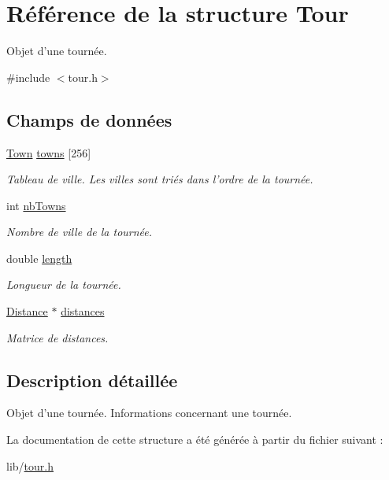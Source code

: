 \hypertarget{structTour}{
\section{Référence de la structure Tour}
\label{structTour}
}


Objet d'une tournée.  




{\ttfamily \#include $<$tour.h$>$}

\subsection*{Champs de données}
\begin{DoxyCompactItemize}
\item 
\hypertarget{structTour_a3bbc2397fe043fdc5d9d18695368f2ca}{
\hyperlink{structTown}{Town} \hyperlink{structTour_a3bbc2397fe043fdc5d9d18695368f2ca}{towns} \mbox{[}256\mbox{]}}
\label{structTour_a3bbc2397fe043fdc5d9d18695368f2ca}

\begin{DoxyCompactList}\small\item\em Tableau de ville. Les villes sont triés dans l'ordre de la tournée. \item\end{DoxyCompactList}\item 
\hypertarget{structTour_af54d0892d0de565850fdf26e98b90a03}{
int \hyperlink{structTour_af54d0892d0de565850fdf26e98b90a03}{nbTowns}}
\label{structTour_af54d0892d0de565850fdf26e98b90a03}

\begin{DoxyCompactList}\small\item\em Nombre de ville de la tournée. \item\end{DoxyCompactList}\item 
\hypertarget{structTour_ad7ec8574d813b76140f78b035cdd93a9}{
double \hyperlink{structTour_ad7ec8574d813b76140f78b035cdd93a9}{length}}
\label{structTour_ad7ec8574d813b76140f78b035cdd93a9}

\begin{DoxyCompactList}\small\item\em Longueur de la tournée. \item\end{DoxyCompactList}\item 
\hypertarget{structTour_a4da8a499459d000a23d79af9d1a5565d}{
\hyperlink{structDistance}{Distance} $\ast$ \hyperlink{structTour_a4da8a499459d000a23d79af9d1a5565d}{distances}}
\label{structTour_a4da8a499459d000a23d79af9d1a5565d}

\begin{DoxyCompactList}\small\item\em Matrice de distances. \item\end{DoxyCompactList}\end{DoxyCompactItemize}


\subsection{Description détaillée}
Objet d'une tournée. Informations concernant une tournée. 

La documentation de cette structure a été générée à partir du fichier suivant :\begin{DoxyCompactItemize}
\item 
lib/\hyperlink{tour_8h}{tour.h}\end{DoxyCompactItemize}
